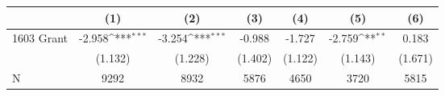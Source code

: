 {
\def\sym#1{\ifmmode^{#1}\else\(^{#1}\)\fi}
\begin{tabular}{l*{6}{c}}
\toprule
                &\multicolumn{1}{c}{(1)}         &\multicolumn{1}{c}{(2)}         &\multicolumn{1}{c}{(3)}         &\multicolumn{1}{c}{(4)}         &\multicolumn{1}{c}{(5)}         &\multicolumn{1}{c}{(6)}         \\
\midrule
1603 Grant      &   -2.958\sym{***}&   -3.254\sym{***}&   -0.988         &   -1.727         &   -2.759\sym{**} &    0.183         \\
                &  (1.132)         &  (1.228)         &  (1.402)         &  (1.122)         &  (1.143)         &  (1.671)         \\
\midrule
N               &     9292         &     8932         &     5876         &     4650         &     3720         &     5815         \\
\bottomrule
\end{tabular}
}
